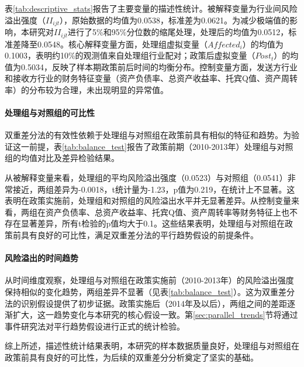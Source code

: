 表\ref{tab:descriptive_stats}报告了主要变量的描述性统计。被解释变量为行业间风险溢出强度（$II_{ijt}$），原始数据的均值为0.0538，标准差为0.0621。为减少极端值的影响，本研究对$II_{ijt}$进行了5\%和95\%分位数的缩尾处理，处理后的均值为0.0512，标准差降至0.0548。核心解释变量方面，处理组虚拟变量（$Affected_i$）的均值为0.1003，表明约10\%的观测值来自处理组行业配对；政策后虚拟变量（$Post_t$）的均值为0.5034，反映了样本期政策前后时间的均衡分布。控制变量方面，发送方行业和接收方行业的财务特征变量（资产负债率、总资产收益率、托宾Q值、资产周转率）的分布较为合理，未出现明显的异常值。


\paragraph{处理组与对照组的可比性}

双重差分法的有效性依赖于处理组与对照组在政策前具有相似的特征和趋势。为验证这一前提，表\ref{tab:balance_test}报告了政策前期（2010-2013年）处理组与对照组的均值对比及差异检验结果。

从被解释变量来看，处理组的平均风险溢出强度（0.0523）与对照组（0.0541）非常接近，两组差异为-0.0018，t统计量为-1.23，p值为0.219，在统计上不显著。这表明在政策实施前，处理组和对照组的风险溢出水平并无显著差异。从控制变量来看，两组在资产负债率、总资产收益率、托宾Q值、资产周转率等财务特征上也不存在显著差异，所有t检验的p值均大于0.1。这些结果表明，处理组与对照组在政策前具有良好的可比性，满足双重差分法的平行趋势假设的前提条件。


\paragraph{风险溢出的时间趋势}

从时间维度观察，处理组与对照组在政策实施前（2010-2013年）的风险溢出强度保持相似的变化趋势，两组差异不显著（见表\ref{tab:balance_test}）。这为双重差分法的识别假设提供了初步证据。政策实施后（2014年及以后），两组之间的差距逐渐扩大，这一趋势变化与本研究的核心假设一致。第\ref{sec:parallel_trends}节将通过事件研究法对平行趋势假设进行正式的统计检验。

综上所述，描述性统计结果表明，本研究的样本数据质量良好，处理组与对照组在政策前具有良好的可比性，为后续的双重差分分析奠定了坚实的基础。


